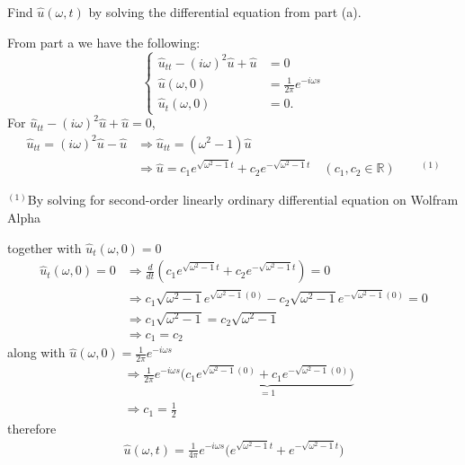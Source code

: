 \documentclass[12pt]{article}
\newcommand{\R}{\mathbb{R}}
\newcommand{\lra}{\Longrightarrow}
\newenvironment{subproblem}[2][Part]{\begin{trivlist}
  \item[\hskip \labelsep {\bfseries #1}\hskip \labelsep {\bfseries (#2)}]}{\end{trivlist}}
\newenvironment{solution}[1][Solution]{\begin{trivlist}
  \item[\hskip \labelsep {\bfseries #1} \hskip \labelsep]}{\end{trivlist}}
\theoremstyle{remark}
\begin{document}
\begin{subproblem}{b}
  Find \(\hat{u}(\omega,t)\) by solving the differential equation from part (a).
\end{subproblem}
\begin{solution}
  From part a we have the following:
  \[
    \left\{
      \begin{array}{ll}
        \hat{u}_{tt} - (i\omega)^2\hat{u} + \hat{u} &= 0 \\
        \hat{u}(\omega,0) &= \frac{1}{2\pi}e^{-i\omega s} \\
        \hat{u}_t(\omega,0) &= 0.
      \end{array}
    \right.
  \]
  For \(\hat{u}_{tt} - (i\omega)^2\hat{u} + \hat{u} = 0\),
  \begin{align*}
    \hat{u}_{tt} = (i\omega)^2\hat{u} - \hat{u} &\lra \hat{u}_{tt} = (\omega^2 - 1)\hat{u} \\
                                                &\lra \hat{u} = c_1e^{\sqrt{\omega^2-1}t}+
                                                  c_2e^{-\sqrt{\omega^2-1}t}
                                                  \quad (c_1,c_2 \in \R)\qquad^{(1)}
  \end{align*}
  \begin{footnotesize}
    \(^{(1)}\)By solving for second-order linearly ordinary differential
    equation on Wolfram Alpha \\
  \end{footnotesize}
  $ $\\
  together with \(\hat{u}_t(\omega,0) = 0\)
  \begin{align*}
    \hat{u}_t(\omega,0) = 0 &\lra \frac{d}{dt}(c_1e^{\sqrt{\omega^2-1}t}+ c_2e^{-\sqrt{\omega^2-1}t}) = 0\\
                            &\lra c_1\sqrt{\omega^2-1}e^{\sqrt{\omega^2-1}(0)} -
                              c_2\sqrt{\omega^2-1}e^{-\sqrt{\omega^2-1}(0)} = 0 \\
                            &\lra c_1\sqrt{\omega^2-1} = c_2\sqrt{\omega^2-1} \\
                            &\lra c_1 = c_2 
  \end{align*}
  along with \(\hat{u}(\omega,0) = \frac{1}{2\pi}e^{-i\omega s}\)
  \begin{align*}
    &\lra \frac{1}{2\pi}e^{-i\omega s} \underbrace{\bigg(c_1e^{\sqrt{\omega^2-1}(0)}+
      c_1e^{-\sqrt{\omega^2-1}(0)} \bigg)}_{= 1} \\
    &\lra c_1 = \frac{1}{2}
  \end{align*}
  therefore
  \begin{align*}
    \boxed{
    \hat{u}(\omega,t) = \frac{1}{4\pi}e^{-i\omega s}\bigg(e^{\sqrt{\omega^2-1}t}+
    e^{-\sqrt{\omega^2-1}t} \bigg)
    }
  \end{align*}
\end{solution}
\end{document}
